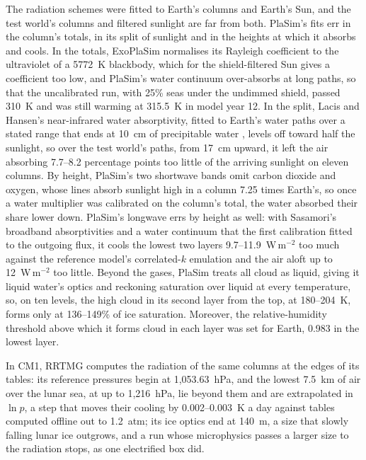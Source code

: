 The radiation schemes were fitted to Earth's columns and Earth's Sun, and the test world's columns and filtered
sunlight are far from both. PlaSim's fits err in the column's totals, in its split of sunlight and in the
heights at which it absorbs and cools. In the totals, ExoPlaSim normalises its Rayleigh coefficient to the
ultraviolet of a 5772~K blackbody, which for the shield-filtered Sun gives a coefficient too low, and PlaSim's
water continuum over-absorbs at long paths, so that the uncalibrated run, with 25\% seas under the
undimmed shield, passed 310~K and was still warming at 315.5~K in model year 12. In the split, Lacis
and Hansen's near-infrared water absorptivity, fitted to Earth's water paths over a stated range that ends at
10~cm of precipitable water \autocite{lacis1974parameterization}, levels off toward half the sunlight, so over the
test world's paths, from 17~cm upward, it left the air absorbing 7.7--8.2 percentage points too little of the
arriving sunlight on eleven columns. By height, PlaSim's two shortwave bands omit carbon
dioxide and oxygen, whose lines absorb sunlight high in a column 7.25 times Earth's, so once a water multiplier
was calibrated on the column's total, the water absorbed their share lower down. PlaSim's longwave errs by height as well: with Sasamori's broadband absorptivities \autocite{sasamori1968radiative} and a water continuum that the first calibration fitted to the outgoing flux, it cools the lowest two layers 9.7--11.9~W\,m$^{-2}$ too much against the
reference model's correlated-$k$ emulation and the air aloft up to 12~W\,m$^{-2}$ too little.
Beyond the gases, PlaSim treats all cloud as liquid, giving it liquid water's optics and reckoning saturation over
liquid at every temperature, so, on ten levels, the high cloud
in its second layer from the top, at 180--204~K, forms only at 136--149\% of ice saturation. Moreover, the relative-humidity threshold above which it
forms cloud in each layer was set for Earth, 0.983 in the lowest layer.

In CM1, RRTMG computes the radiation of the same columns at the edges of its tables: its reference pressures begin at 1,053.63~hPa, and
the lowest 7.5~km of air over the lunar sea, at up to 1,216~hPa, lie beyond them and are extrapolated in
$\ln p$, a step that moves their cooling by 0.002--0.003~K a day against tables computed offline out to
1.2~atm; its ice optics end at 140~\textmu m, a size that slowly falling lunar ice outgrows, and a run whose
microphysics passes a larger size to the radiation stops, as one electrified box did.

